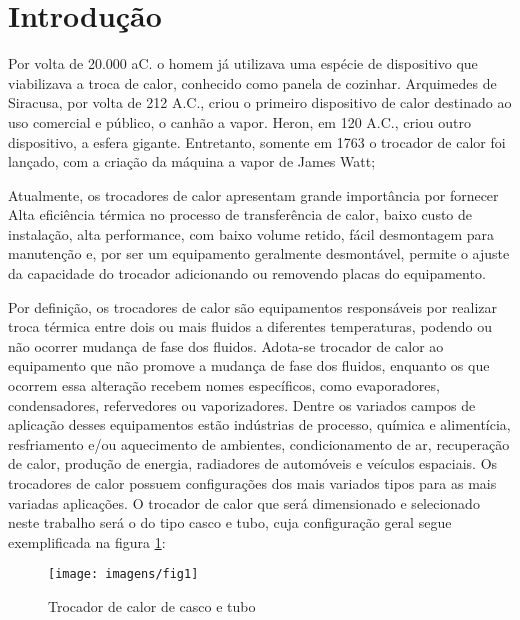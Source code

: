 \section{Introdução}

Por volta de 20.000 aC. o homem já utilizava uma espécie de dispositivo que viabilizava a troca de calor, conhecido como panela de cozinhar. Arquimedes de Siracusa, por volta de 212 A.C., criou o primeiro dispositivo de calor destinado ao uso comercial e público, o canhão a vapor. Heron, em 120 A.C., criou outro dispositivo, a esfera gigante. Entretanto, somente em 1763 o trocador de calor foi lançado, com a criação da máquina a vapor de James Watt; \cite{abdallah_2018_multi}

Atualmente, os trocadores de calor apresentam grande importância por fornecer Alta eficiência térmica no processo de transferência de calor, baixo custo de instalação, alta performance, com baixo volume retido, fácil desmontagem para manutenção e, por ser um equipamento geralmente desmontável, permite o ajuste da capacidade do trocador adicionando ou removendo placas do equipamento.\cite{abdallah_2018_multi}

Por definição, os trocadores de calor são equipamentos responsáveis por realizar troca térmica entre dois ou mais fluidos a diferentes temperaturas, podendo ou não ocorrer mudança de fase dos fluidos. Adota-se trocador de calor ao equipamento que não promove a mudança de fase dos fluidos, enquanto os que ocorrem essa alteração recebem nomes específicos, como evaporadores, condensadores, refervedores ou vaporizadores. Dentre os variados campos de aplicação desses equipamentos estão indústrias de processo, química e alimentícia, resfriamento e/ou aquecimento de ambientes, condicionamento de ar, recuperação de calor, produção de energia, radiadores de automóveis e veículos espaciais.\cite{abdallah_2018_multi}
Os trocadores de calor possuem configurações dos mais variados tipos para as mais variadas aplicações. O trocador de calor que será dimensionado e selecionado neste trabalho será o do tipo casco e tubo, cuja configuração geral segue exemplificada na figura \ref{fig:fig1}: \cite{abdallah_2018_multi, incase_2022_trocador}
\\
\begin{figure}[h]
	\centering
	\caption{Trocador de calor de casco e tubo}
	\label{fig:fig1}
	\texttt{[image: imagens/fig1]}
	
\end{figure}

